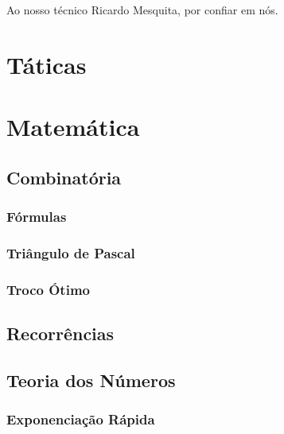 





\begin{dedication} 
\Large{Ao nosso técnico Ricardo Mesquita, por confiar em nós. }
\end{dedication}

\tableofcontents


% 
\chapter{Táticas}


% 
\chapter{Matemática}
    \section{Combinatória}
        \subsection{Fórmulas}
            
        \subsection{Triângulo de Pascal}
            
            \newpage
        \subsection{Troco Ótimo}
            
            \newpage
    \section{Recorrências}
        
        \newpage
    \section{Teoria dos Números}
        \subsection{Exponenciação Rápida}
            
            \newpage
